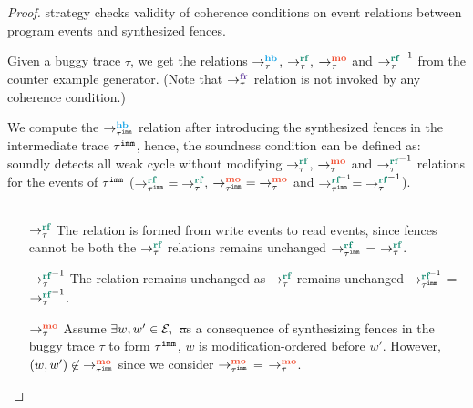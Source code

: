 { \label{thm:weak-sound}}
\begin{proof}
	\wkfence strategy checks validity of coherence conditions
	on event relations between program events and synthesized
	fences.
	
	Given a buggy trace $\tau$, we get the relations $\setHB$,
	$\setRF$, $\setMO$ and $\setRF^{-1}$ from the counter
	example generator.
	(Note that $\setFR$ relation is not invoked by any 
	coherence condition.)
	
	We compute the $\hb{\imm{\tau}}{}{}$ relation after introducing 
	the synthesized fences in the intermediate trace ${\tau}^{\mathtt{imm}}$, 
	hence, the soundness condition can be defined as: 
	\ourtechnique soundly detects all weak cycle without modifying 
	$\setRF$, $\setMO$ and $\setRF^{-1}$ relations for the events of 
	${\tau}^{\mathtt{imm}}$ (\ie $\rf{\imm{\tau}}{}{} = \setRF$, 
	$\mo{\imm{\tau}}{}{} = \setMO$ and $\rfinv{\imm{\tau}}{}{} = 
	\setRF^{-1}$).
	
	\begin{figure}[h]
		\begin{tabular}{|c|c|c|c|}
			\hline
			\resizebox{0.19\textwidth}{!}{} &
			\resizebox{0.25\textwidth}{!}{} &
			\resizebox{0.25\textwidth}{!}{} &
			\resizebox{0.27\textwidth}{!}{} \\
			\hline
		\end{tabular}
		\label{fig:como}
	\end{figure}
	
	
	\begin{itemize}[label=setmm,align=left,leftmargin=*]
		\item [$\setRF$] The relation is formed from write events 
			to read events, since fences cannot be both the $\setRF$
			relations remains unchanged \ie $\rf{\imm{\tau}}{}{}$ =
			$\setRF$.
		
		\item [$\setRF^{-1}$] The relation remains unchanged as 
			$\setRF$ remains unchanged \ie $\rfinv{\imm{\tau}}{}{}$ 
			= $\setRF^{-1}$.
		
		\item [$\setMO$] Assume $\exists w, w' \in \mathcal{E}_\tau$ \st 
			as a consequence of synthesizing fences in the buggy trace 
			$\tau$ to form ${\tau}^{\mathtt{imm}}$, $w$ is modification-ordered
			before $w'$. However, $(w,w') \nin \mo{\imm{\tau}}{}{}$
			since we consider $\mo{\imm{\tau}}{}{}$ = $\setMO$.
			

\end{itemize}
\end{proof}
